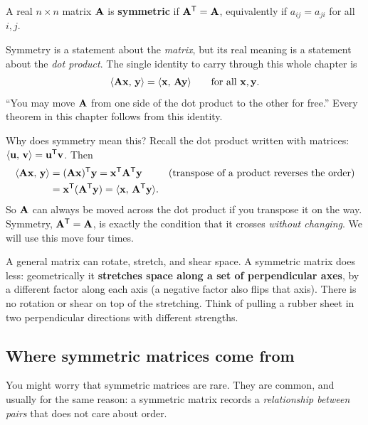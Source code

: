 \begin{definition}
\label{ch26:def-symmetric}
A real $n\times n$ matrix $\mathbf{A}$ is \textbf{symmetric} if $\mathbf{A}^{\mathsf{T}} = \mathbf{A}$,
equivalently if $a_{ij} = a_{ji}$ for all $i,j$.
\end{definition}

\begin{focusbox}
Symmetry is a statement about the \emph{matrix}, but its real meaning is a
statement about the \emph{dot product}. The single identity to carry through this
whole chapter is
\[
  \langle \mathbf{A}\mathbf{x},\, \mathbf{y} \rangle = \langle \mathbf{x},\, \mathbf{A}\mathbf{y} \rangle
  \qquad\text{for all } \mathbf{x},\mathbf{y}.
\]
``You may move $\mathbf{A}$ from one side of the dot product to the other for free.''
Every theorem in this chapter follows from this identity.
\end{focusbox}

Why does symmetry mean this? Recall the dot product written with matrices:
$\langle \mathbf{u},\, \mathbf{v} \rangle = \mathbf{u}^{\mathsf{T}}\mathbf{v}$. Then
\begin{align*}
  \langle \mathbf{A}\mathbf{x},\, \mathbf{y} \rangle
  &= (\mathbf{A}\mathbf{x})^{\mathsf{T}}\mathbf{y}
  = \mathbf{x}^{\mathsf{T}} \mathbf{A}^{\mathsf{T}} \mathbf{y} && \text{(transpose of a product reverses the order)}\\
  &= \mathbf{x}^{\mathsf{T}}(\mathbf{A}^{\mathsf{T}}\mathbf{y})
  = \langle \mathbf{x},\, \mathbf{A}^{\mathsf{T}}\mathbf{y} \rangle.
\end{align*}
So $\mathbf{A}$ can always be moved across the dot product if you transpose it on the
way. Symmetry, $\mathbf{A}^{\mathsf{T}}=\mathbf{A}$, is exactly the condition that it crosses
\emph{without changing}. We will use this move four times.

\begin{intuitionbox}
A general matrix can rotate, stretch, and shear space. A symmetric matrix does
less: geometrically it \textbf{stretches space along a set of perpendicular
axes}, by a different factor along each axis (a negative factor also flips that
axis). There is no rotation or shear on top of the stretching. Think of pulling a
rubber sheet in two perpendicular directions with different strengths.
\end{intuitionbox}

\subsection{Where symmetric matrices come from}
\label{ch26:where-from}

You might worry that symmetric matrices are rare. They are common, and usually
for the same reason: a symmetric matrix records a \emph{relationship between
pairs} that does not care about order.

